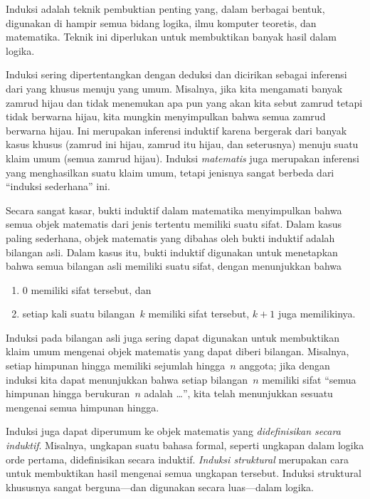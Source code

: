 \documentclass[../../../include/open-logic-section]{subfiles}
\begin{document}


Induksi adalah teknik pembuktian penting yang, dalam berbagai bentuk,
digunakan di hampir semua bidang logika, ilmu komputer teoretis, dan
matematika. Teknik ini diperlukan untuk membuktikan banyak hasil dalam
logika.

Induksi sering dipertentangkan dengan deduksi dan dicirikan sebagai
inferensi dari yang khusus menuju yang umum. Misalnya, jika kita mengamati
banyak zamrud hijau dan tidak menemukan apa pun yang akan kita sebut zamrud
tetapi tidak berwarna hijau, kita mungkin menyimpulkan bahwa semua zamrud
berwarna hijau. Ini merupakan inferensi induktif karena bergerak dari banyak
kasus khusus (zamrud ini hijau, zamrud itu hijau, dan seterusnya) menuju
suatu klaim umum (semua zamrud hijau). Induksi \emph{matematis} juga
merupakan inferensi yang menghasilkan suatu klaim umum, tetapi jenisnya
sangat berbeda dari ``induksi sederhana'' ini.

Secara sangat kasar, bukti induktif dalam matematika menyimpulkan bahwa
semua objek matematis dari jenis tertentu memiliki suatu sifat. Dalam kasus
paling sederhana, objek matematis yang dibahas oleh bukti induktif adalah
bilangan asli. Dalam kasus itu, bukti induktif digunakan untuk menetapkan
bahwa semua bilangan asli memiliki suatu sifat, dengan menunjukkan bahwa
\begin{enumerate}
    \item $0$ memiliki sifat tersebut, dan
    \item setiap kali suatu bilangan~$k$ memiliki sifat tersebut, $k+1$
      juga memilikinya.
\end{enumerate}
Induksi pada bilangan asli juga sering dapat digunakan untuk membuktikan
klaim umum mengenai objek matematis yang dapat diberi bilangan. Misalnya,
setiap himpunan hingga memiliki sejumlah hingga~$n$ anggota; jika dengan
induksi kita dapat menunjukkan bahwa setiap bilangan~$n$ memiliki sifat
``semua himpunan hingga berukuran~$n$ adalah \dots'', kita telah menunjukkan
sesuatu mengenai semua himpunan hingga.

Induksi juga dapat diperumum ke objek matematis yang \emph{didefinisikan
secara induktif}. Misalnya, ungkapan suatu bahasa formal, seperti ungkapan
dalam logika orde pertama, didefinisikan secara induktif. \emph{Induksi
struktural} merupakan cara untuk membuktikan hasil mengenai semua ungkapan
tersebut. Induksi struktural khususnya sangat berguna---dan digunakan secara
luas---dalam logika.
\end{document}

